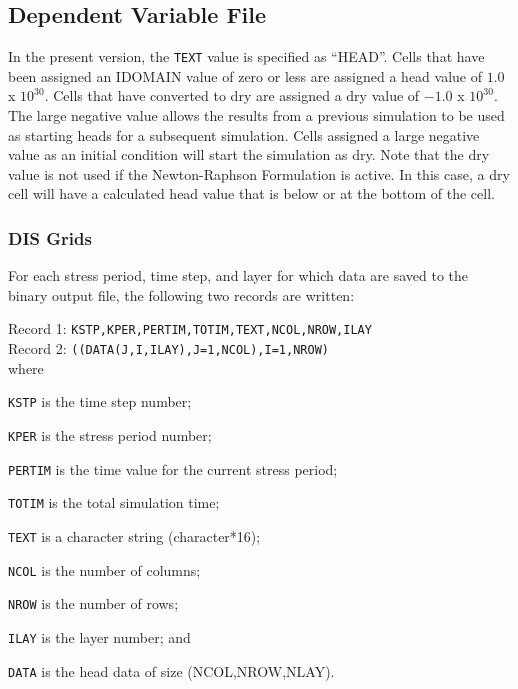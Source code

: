 \subsection{Dependent Variable File}
In the present \mf version, the \texttt{TEXT} value is specified as ``HEAD''.  Cells that have been assigned an IDOMAIN value of zero or less are assigned a head value of $1.0$ x $10^{30}$.  Cells that have converted to dry are assigned a dry value of $-1.0$ x $10^{30}$.  The large negative value allows the results from a previous simulation to be used as starting heads for a subsequent simulation.  Cells assigned a large negative value as an initial condition will start the simulation as dry.  Note that the dry value is not used if the Newton-Raphson Formulation is active.  In this case, a dry cell will have a calculated head value that is below or at the bottom of the cell.

\subsubsection{DIS Grids}
For each stress period, time step, and layer for which data are saved to the binary output file, the following two records are written:

\vspace{5mm}
\noindent Record 1: \texttt{KSTP,KPER,PERTIM,TOTIM,TEXT,NCOL,NROW,ILAY} \\
\noindent Record 2: \texttt{((DATA(J,I,ILAY),J=1,NCOL),I=1,NROW)} \\

\vspace{5mm}
\noindent where

\begin{description} \itemsep0pt \parskip0pt 
\item \texttt{KSTP} is the time step number;
\item \texttt{KPER} is the stress period number;
\item \texttt{PERTIM} is the time value for the current stress period; 
\item \texttt{TOTIM} is the total simulation time;
\item \texttt{TEXT} is a character string (character*16);
\item \texttt{NCOL} is the number of columns;
\item \texttt{NROW} is the number of rows;
\item \texttt{ILAY} is the layer number; and
\item \texttt{DATA} is the head data of size (NCOL,NROW,NLAY).
\end{description}

